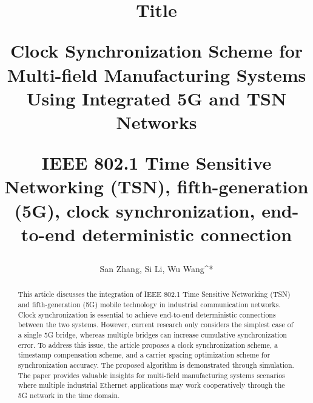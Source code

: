\documentclass[english]{cccconf}
\begin{document}
	\title{Title}
\title{Clock Synchronization Scheme for Multi-field Manufacturing Systems Using Integrated 5G and TSN Networks
	
\author{San Zhang, Si Li, Wu Wang^*}





\maketitle
\maketitle
\begin{abstract}
This article discusses the integration of IEEE 802.1 Time Sensitive Networking (TSN) and fifth-generation (5G) mobile technology in industrial communication networks. Clock synchronization is essential to achieve end-to-end deterministic connections between the two systems. However, current research only considers the simplest case of a single 5G bridge, whereas multiple bridges can increase cumulative synchronization error. To address this issue, the article proposes a clock synchronization scheme, a timestamp compensation scheme, and a carrier spacing optimization scheme for synchronization accuracy. The proposed algorithm is demonstrated through simulation. The paper provides valuable insights for multi-field manufacturing systems scenarios where multiple industrial Ethernet applications may work cooperatively through the 5G network in the time domain.
\end{abstract}

\begin{IEEEkeywords}
IEEE 802.1 Time Sensitive Networking (TSN), fifth-generation (5G), clock synchronization, end-to-end deterministic connection
\end{IEEEkeywords}


}
\end{document}
